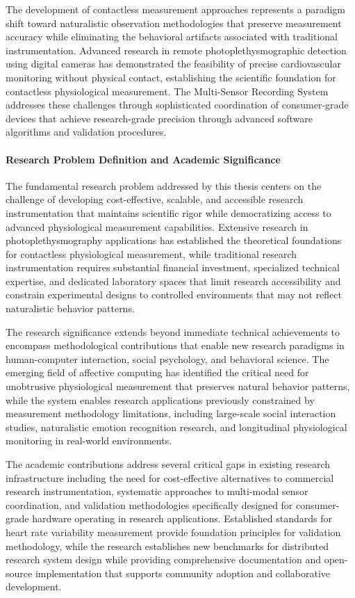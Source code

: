\documentclass[12pt,a4paper]{report}
\begin{document}
The development of contactless measurement approaches represents a paradigm shift toward naturalistic observation
methodologies that preserve measurement accuracy while eliminating the behavioral artifacts associated with traditional
instrumentation. Advanced research in remote photoplethysmographic detection using digital cameras has demonstrated the
feasibility of precise cardiovascular monitoring without physical contact, establishing the scientific foundation for
contactless physiological measurement. The Multi-Sensor Recording System addresses these challenges through
sophisticated coordination of consumer-grade devices that achieve research-grade precision through advanced software
algorithms and validation procedures.

\paragraph{Research Problem Definition and Academic Significance}

The fundamental research problem addressed by this thesis centers on the challenge of developing cost-effective,
scalable, and accessible research instrumentation that maintains scientific rigor while democratizing access to advanced
physiological measurement capabilities. Extensive research in photoplethysmography applications has established the
theoretical foundations for contactless physiological measurement, while traditional research instrumentation requires
substantial financial investment, specialized technical expertise, and dedicated laboratory spaces that limit research
accessibility and constrain experimental designs to controlled environments that may not reflect naturalistic behavior
patterns.

The research significance extends beyond immediate technical achievements to encompass methodological contributions that
enable new research paradigms in human-computer interaction, social psychology, and behavioral science. The emerging
field of affective computing has identified the critical need for unobtrusive physiological measurement that preserves
natural behavior patterns, while the system enables research applications previously constrained by measurement
methodology limitations, including large-scale social interaction studies, naturalistic emotion recognition research,
and longitudinal physiological monitoring in real-world environments.

The academic contributions address several critical gaps in existing research infrastructure including the need for
cost-effective alternatives to commercial research instrumentation, systematic approaches to multi-modal sensor
coordination, and validation methodologies specifically designed for consumer-grade hardware operating in research
applications. Established standards for heart rate variability measurement provide foundation principles for validation
methodology, while the research establishes new benchmarks for distributed research system design while providing
comprehensive documentation and open-source implementation that supports community adoption and collaborative
development.
\end{document}
